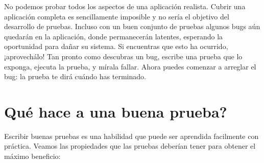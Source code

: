 \documentclass[a4paper,10pt,twoside]{book}
\begin{document}

No podemos probar todos los aspectos de una aplicaci\'on realista.
Cubrir una aplicaci\'on completa es sencillamente imposible y no ser\'ia el objetivo del desarrollo de pruebas.
Incluso con un buen conjunto de pruebas
algunos bugs a\'un quedar\'an en la aplicaci\'on, donde permanecer\'an latentes, esperando la oportunidad para da\~nar su sistema.
Si encuentras que esto ha ocurrido, ¡aprovech\'alo!
Tan pronto como descubras un bug, escribe una prueba que lo exponga, ejecuta la prueba, y m\'irala fallar.
Ahora puedes comenzar a arreglar el bug: la prueba te dir\'a cu\'ando has terminado.

\section{\¿Qu\'e hace a una buena prueba?}

Escribir buenas pruebas es una habilidad que puede ser aprendida facilmente con pr\'actica.
Veamos las propiedades que las pruebas deber\'ian tener para obtener el m\'aximo beneficio: 
\end{document}
